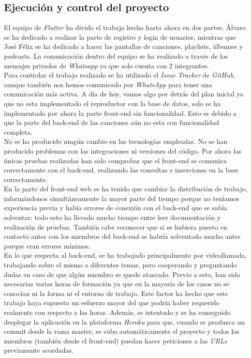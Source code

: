 \documentclass{article}
\begin{document}
\subsection{Ejecución y control del proyecto}
El equipo de \textit{Flutter} ha divido el trabajo hecho hasta ahora en dos partes. Álvaro se ha dedicado a realizar la parte de registro y login de usuarios, mientras que José Félix se ha dedicado a hacer las pantallas de canciones, playlists, álbumes y podcasts. La comunicación dentro del equipo se ha realizado a través de los mensajes privados de \textit{Whatsapp} ya que solo cuenta con 2 integrantes.\\
\hfill \break
Para controlar el trabajo realizado se ha utilizado el \textit{Issue Tracker} de \textit{GitHub}, aunque también nos hemos comunicado por \textit{WhatsApp} para tener una comunicación más activa.
A día de hoy, vamos algo por detrás del plan inicial ya que no esta implementado el reproductor con la base de datos, solo se ha implementado por ahora la parte front-end sin funcionalidad. Esto es debido a que la parte del back-end de las canciones aún no esta con funcionalidad completa.\\
\hfill \break
No se ha producido ningún cambio en las tecnologías empleadas.
No se han producido problemas con las integraciones ni versiones del código.
Por ahora las únicas pruebas realizadas han sido comprobar que el front-end se comunica correctamente con el back-end, realizando las consultas e inserciones en la base correctamente.\\
\hfill \break
En la parte del front-end web se ha tenido que cambiar la distribución de trabajo, informándonos simultáneamente la mayor parte del tiempo porque no teníamos experiencia previa y había errores de conexión con el back-end que se sabía solventar; todo esto ha llevado mucho tiempo entre leer documentación y realización de pruebas. También cabe reconocer que si se hubiera puesto en contacto antes con los miembros del back-end se habría solventado mucho antes porque eran errores mínimos.\\
\hfill \break
En lo que respecta al back-end, se ha trabajado principalmente por videollamada, trabajando sobre el mismo o diferentes temas, pero cooperando y preguntando dudas en caso de que algún miembro se quede atascado. Previo a esto, han sido necesarias varias horas de formación ya que en la mayoría de los casos no se conocían ni la forma ni el entorno de trabajo. 
Este factor ha hecho que este trabajo haya supuesto un esfuerzo mayor del que podría haber requerido realmente con respecto a las horas.
Además, se intentado y se ha conseguido desplegar la aplicación en la plataforma \textit{Heroku} para que, cuando se produzca un commit desde la rama master, se suba automáticamente el proyecto y todos los miembros (también desde el front-end) puedan hacer peticiones a las \textit{URLs} previamente acordadas.
\end{document}
